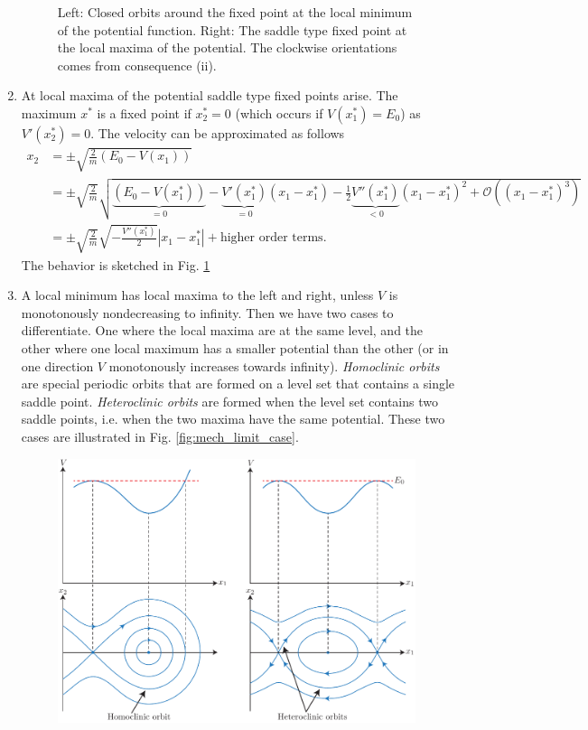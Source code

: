 \begin{enumerate}
\begin{figure}[h!]
	\caption{Left: Closed orbits around the fixed point at the local minimum of the potential function. Right: The saddle type fixed point at the local maxima of the potential. The clockwise orientations comes from consequence (ii).}
	\label{fig:mech_loc_extrem}
\end{figure}
\item At local maxima of the potential saddle type fixed points arise. The maximum $x^{*}$ is a fixed point if $x^{*}_2=0 $ (which occurs if $V(x^*_1)=E_0$) as $V'(x^{*}_2)=0$. The velocity can be approximated as follows
	\begin{subequations}
	 \begin{align}
		 x_2 &= \pm \sqrt{\frac{2}{m}(E_0 -V(x_1))} \\
		     &= \pm \sqrt{\frac{2}{m}} \sqrt{\underbrace{(E_0 - V(x^{*}_1))}_{=0} - \underbrace{V'(x^{*}_{1})}_{=0}(x_1 - x^{*}_1) - \frac{1}{2}\underbrace{V''(x^{*}_1)}_{<0}(x_1 - x^{*}_{1})^2 + \mathcal{O}((x_1 - x^{*}_1)^3)} \\
		     &=\pm \sqrt{\frac{2}{m}}\sqrt{-\frac{V''(x^{*}_1)}{2}}\left|x_1 - x^{*}_1\right| +  \textrm{higher order terms} .
	\end{align}
\end{subequations}
The behavior is sketched in Fig. \ref{fig:mech_loc_extrem}
\item A local minimum has local maxima to the left and right, unless $V$ is monotonously nondecreasing to infinity. Then we have two cases to differentiate. One where the local maxima are at the same level, and the other where one local maximum has a smaller potential than the other (or in one direction $V$ monotonously increases towards infinity). \emph{Homoclinic orbits} are special periodic orbits that are formed on a level set that contains a single saddle point. \emph{Heteroclinic orbits} are formed when the level set contains two saddle points, i.e. when the two maxima have the same potential. These two cases are illustrated in Fig. \ref{fig:mech_limit_case}. 
	\begin{figure}[h!]
		\centering
		\includegraphics[width=0.99\textwidth]{figures/ch4/4mech_limit_case.pdf}

\end{figure}
\end{enumerate}
